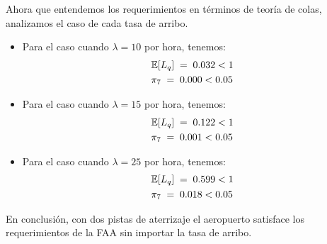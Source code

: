 \documentclass[ a4paper, twoside, 11pt]{article}
\begin{document}
\begin{problem}
\begin{enumerate}[label=\textbf{\alph*)}]
Ahora que entendemos los requerimientos en t\'erminos de teor\'ia de colas, analizamos el caso de cada tasa de arribo. 
\begin{itemize}
\item Para el caso cuando $\lambda = 10$ por hora, tenemos: 
\begin{align*}
& \mathbb{E}[L_q] \; = \; 0.032 < 1 \\
& \pi_7 \; = \; 0.000 < 0.05
\end{align*}
\item Para el caso cuando $\lambda = 15$ por hora, tenemos: 
\begin{align*}
& \mathbb{E}[L_q] \; = \; 0.122 < 1 \\
& \pi_7 \; = \; 0.001 < 0.05
\end{align*}
\item Para el caso cuando $\lambda = 25$ por hora, tenemos: 
\begin{align*}
& \mathbb{E}[L_q] \; = \; 0.599 < 1 \\
& \pi_7 \; = \; 0.018 < 0.05
\end{align*}
\end{itemize}
En conclusi\'on, con dos pistas de aterrizaje el aeropuerto satisface los requerimientos de la FAA sin importar la tasa de arribo. 

\end{enumerate}

\end{problem}
\fullskip
\end{document}
